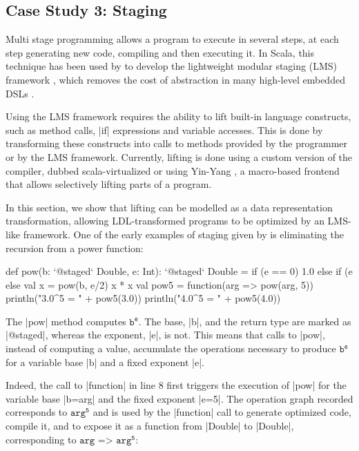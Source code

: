 \subsection{Case Study 3: Staging}
\label{ldl:sec:validation/staging}
Multi stage programming \cite{taha-intro} allows a program to execute in several steps, at each step generating new code, compiling and then executing it. In Scala, this technique has been used by  to develop the lightweight modular staging (LMS) framework \cite{tiark-lms, tiark-building-blocks}, which removes the cost of abstraction in many high-level embedded DSLs \cite{tiark-thesis, staged-sac, nada-js,stucki-odds,ackermann-jet}.

Using the LMS framework requires the ability to lift built-in language constructs, such as method calls, |if| expressions and variable accesses. This is done by transforming these constructs into calls to methods provided by the programmer or by the LMS framework. Currently, lifting is done using a custom version of the compiler, dubbed scala-virtualized \cite{scala-virtualized} or using Yin-Yang \cite{yin-yang}, a macro-based frontend that allows selectively lifting parts of a program.

In this section, we show that lifting can be modelled as a data representation transformation, allowing LDL-transformed programs to be optimized by an LMS-like framework. One of the early examples of staging given by  is eliminating the recursion from a power function:

\begin{lstlisting-nobreak}
 def pow(b: `@staged` Double, e: Int): `@staged` Double =
   if (e == 0) 1.0
   else if (e %
   else {
     val x = pow(b, e/2)
     x * x
   }
 val pow5 = function(arg => pow(arg, 5))
 println("3.0^5 = " + pow5(3.0))
 println("4.0^5 = " + pow5(4.0))
\end{lstlisting-nobreak}

The |pow| method computes $\texttt{b}^{\texttt{e}}$. The base, |b|, and the return type are marked as |@staged|, whereas the exponent, |e|, is not. This means that calls to |pow|, instead of computing a value, accumulate the operations necessary to produce $\texttt{b}^{\texttt{e}}$ for a variable base |b| and a fixed exponent |e|.


Indeed, the call to |function| in line 8 first triggers the execution of |pow| for the variable base |b=arg| and the fixed exponent |e=5|. The operation graph recorded corresponds to $\texttt{arg}^{\texttt{5}}$ and is used by the |function| call to generate optimized code, compile it, and to expose it as a function from |Double| to |Double|, corresponding to $\texttt{arg => arg}^\texttt{5}$:

